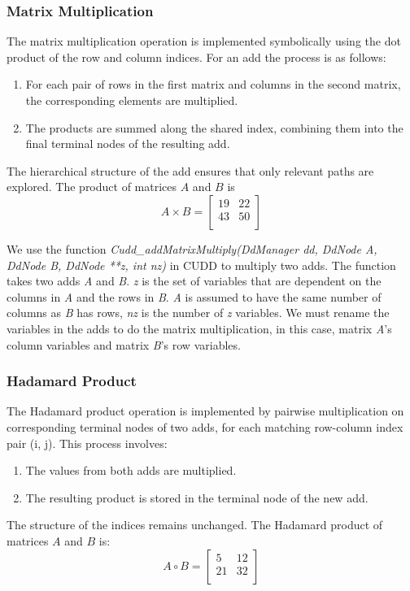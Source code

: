 \subsubsection{Matrix Multiplication}
The matrix multiplication operation is implemented symbolically using the dot product of the row and column indices. 
For an \gls{add} the process is as follows:
\begin{enumerate}
    \item For each pair of rows in the first matrix and columns in the second matrix, the corresponding elements are multiplied.
    \item The products are summed along the shared index, combining them into the final terminal nodes of the resulting \gls{add}.
\end{enumerate}
The hierarchical structure of the \gls{add} ensures that only relevant paths are explored.
The product of matrices $A$ and $B$ is
\[
    A \times B = \begin{bmatrix}
        19 & 22 \\
        43 & 50 \\
    \end{bmatrix}
\]

We use the function \textit{Cudd\_addMatrixMultiply(DdManager dd, DdNode A, DdNode B, DdNode **z, int nz)} in CUDD to multiply two \glspl{add}. 
The function takes two \glspl{add} \textit{A} and \textit{B}. 
\textit{z} is the set of variables that are dependent on the columns in \textit{A} and the rows in \textit{B}.
\textit{A} is assumed to have the same number of columns as \textit{B} has rows, \textit{nz} is the number of \textit{z} variables.
We must rename the variables in the \glspl{add} to do the matrix multiplication, in this case, matrix \textit{A}'s column variables and matrix \textit{B}'s row variables.

\subsubsection{Hadamard Product}\label{subsubsec:hadamard-product}
The Hadamard product operation is implemented by pairwise multiplication on corresponding terminal nodes of two \glspl{add}, for each matching row-column index pair (i, j). This process involves:
\begin{enumerate}
    \item The values from both \glspl{add} are multiplied.
    \item The resulting product is stored in the terminal node of the new \gls{add}.
\end{enumerate}
The structure of the indices remains unchanged.
The Hadamard product of matrices $A$ and $B$ is:
\[
    A \circ B = \begin{bmatrix}
        5  & 12 \\
        21 & 32 \\
    \end{bmatrix}
\]

